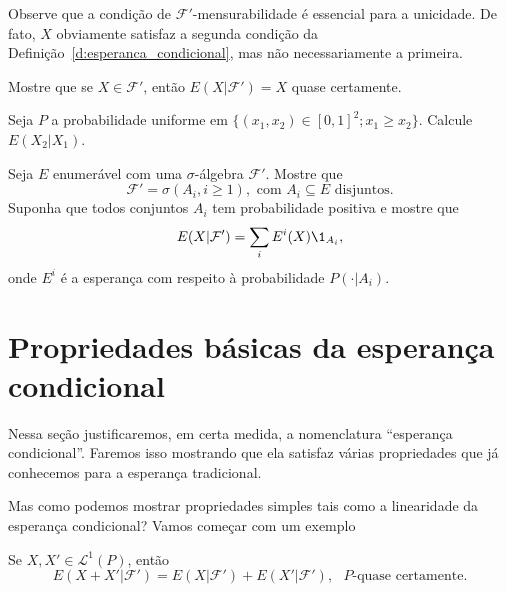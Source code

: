 Observe que a condição de $\mathcal{F}'$-mensurabilidade é essencial para a unicidade.
De fato, $X$ obviamente satisfaz a segunda condição da Definição~\ref{d:esperanca_condicional}, mas não necessariamente a primeira.

\begin{exercise}
  Mostre que se $X \in \mathcal{F}'$, então $E(X|\mathcal{F}') = X$ quase certamente.
\end{exercise}

\begin{exercise}
  Seja $P$ a probabilidade uniforme em $\{(x_1, x_2) \in [0,1]^2; x_1 \geq x_2\}$.
  Calcule $E(X_2|X_1)$.
\end{exercise}

\begin{exercise}
  Seja $E$ enumerável com uma $\sigma$-álgebra $\mathcal{F}'$.
  Mostre que
  \begin{equation}
    \mathcal{F}' = \sigma(A_i, i \geq 1), \text{ com $A_i \subseteq E$ disjuntos}.
  \end{equation}
  Suponha que todos conjuntos $A_i$ tem probabilidade positiva e mostre que
  \begin{equation}
    E(X|\mathcal{F}') = \sum_i E^i(X) \1_{A_i},
  \end{equation}
  onde $E^i$ é a esperança com respeito à probabilidade $P(\cdot|A_i)$.

\end{exercise}


\section{Propriedades básicas da esperança condicional}

Nessa seção justificaremos, em certa medida, a nomenclatura ``esperança condicional''.
Faremos isso mostrando que ela satisfaz várias propriedades que já conhecemos para a esperança tradicional.

Mas como podemos mostrar propriedades simples tais como a linearidade da esperança condicional?
Vamos começar com um exemplo

\begin{proposition}
  Se $X, X' \in \mathcal{L}^1(P)$, então
  \begin{equation}
    E(X + X'|\mathcal{F}') = E(X|\mathcal{F}') + E(X'|\mathcal{F}'), \text{ $P$-quase certamente.}
  \end{equation}
\end{proposition}

